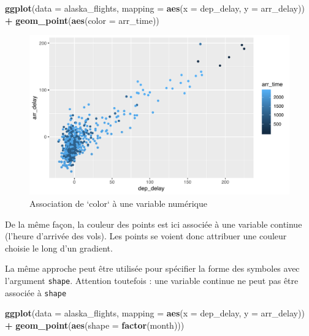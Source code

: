 \documentclass[a4paperpaper,]{article}
\newenvironment{Shaded}{\begin{snugshade}}{\end{snugshade}}
\newcommand{\KeywordTok}[1]{\textcolor[rgb]{0.13,0.29,0.53}{\textbf{#1}}}
\newcommand{\DataTypeTok}[1]{\textcolor[rgb]{0.13,0.29,0.53}{#1}}
\newcommand{\StringTok}[1]{\textcolor[rgb]{0.31,0.60,0.02}{#1}}
\newcommand{\OperatorTok}[1]{\textcolor[rgb]{0.81,0.36,0.00}{\textbf{#1}}}
\newcommand{\NormalTok}[1]{#1}
\theoremstyle{definition}
\theoremstyle{definition}
\theoremstyle{definition}
\theoremstyle{remark}
\begin{document}
\begin{Shaded}
\begin{Highlighting}[]
\KeywordTok{ggplot}\NormalTok{(}\DataTypeTok{data =}\NormalTok{ alaska_flights, }\DataTypeTok{mapping =} \KeywordTok{aes}\NormalTok{(}\DataTypeTok{x =}\NormalTok{ dep_delay, }\DataTypeTok{y =}\NormalTok{ arr_delay)) }\OperatorTok{+}
\StringTok{  }\KeywordTok{geom_point}\NormalTok{(}\KeywordTok{aes}\NormalTok{(}\DataTypeTok{color =}\NormalTok{ arr_time))}
\end{Highlighting}
\end{Shaded}

\begin{figure}[htpb]

{\centering \includegraphics[width=0.9\linewidth]{figure/varcolor2-1} 

}

\caption{Association de `color` à une variable numérique}\label{fig:varcolor2}
\end{figure}

De la même façon, la couleur des points est ici associée à une variable
continue (l'heure d'arrivée des vols). Les points se voient donc
attribuer une couleur choisie le long d'un gradient.

La même approche peut être utilisée pour spécifier la forme des symboles
avec l'argument \texttt{shape}. Attention toutefois : une variable
continue ne peut pas être associée à \texttt{shape}

\begin{Shaded}
\begin{Highlighting}[]
\KeywordTok{ggplot}\NormalTok{(}\DataTypeTok{data =}\NormalTok{ alaska_flights, }\DataTypeTok{mapping =} \KeywordTok{aes}\NormalTok{(}\DataTypeTok{x =}\NormalTok{ dep_delay, }\DataTypeTok{y =}\NormalTok{ arr_delay)) }\OperatorTok{+}
\StringTok{  }\KeywordTok{geom_point}\NormalTok{(}\KeywordTok{aes}\NormalTok{(}\DataTypeTok{shape =} \KeywordTok{factor}\NormalTok{(month)))}
\end{Highlighting}
\end{Shaded}
\end{document}
